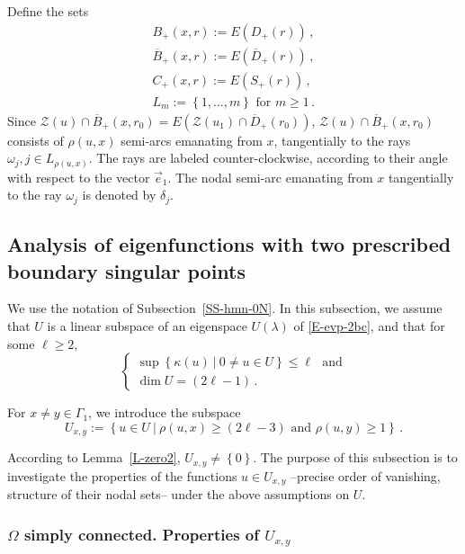 \documentclass[12pt,a4paper]{amsart}
\theoremstyle{plain} %
\theoremstyle{definition}
\numberwithin{equation}{section}
\numberwithin{figure}{section}
\numberwithin{table}{section}
\newcommand{\cZ}{\mathcal{Z}}
\newcommand{\wb}[1]{\overline{#1}}
\newcommand{\set}[1]{\left\lbrace #1 \right\rbrace}
\begin{document}
{Define the sets
%
\begin{equation}\label{E-hmn-21b6}
\begin{array}{l}
B_{+}(x,r) := E(D_{+}(r))\,,\\[5pt]
\wb{B}_{+}(x,r) := E(\wb{D}_{+}(r))\,,\\[5pt]
C_{+}(x,r) := E(S_{+}(r))\,,\\[5pt]
L_m := \set{1, \ldots, m} \text{~for~} m \ge 1\,.
\end{array}
\end{equation}
%
Since $\cZ(u) \cap \wb{B}_{+}(x,r_0) = E\left( \cZ(u_1) \cap
\wb{D}_{+}(r_0)\right)$, $\cZ(u) \cap \wb{B}_{+}(x,r_0)$ consists of $\rho(u,x)$ semi-arcs emanating from $x$, tangentially to the rays $\omega_j, j \in L_{\rho(u,x)}$. The rays are labeled  counter-clockwise, according to their angle with respect to the vector $\vec{e}_1$. The nodal semi-arc emanating from $x$ tangentially to the ray $\omega_j$ is denoted by $\delta_j$.\smallskip


\subsection{Analysis of eigenfunctions with two prescribed  boundary singular points}\label{SS-hmn-21}

We use the notation of Subsection~\ref{SS-hmn-0N}.  In this subsection, we assume that $U$ is a linear subspace of an eigenspace $U(\lambda)$ of \eqref{E-evp-2bc}, and that for some $\ell \ge 2$,
%
\begin{equation*}
\left\{
\begin{array}{l}
\sup\set{\kappa(u) ~|~ 0 \neq u \in U} \le \ell \text{~~and}\\[5pt]
\dim U = (2\ell - 1)\,.
\end{array}%
\right.
\end{equation*}

For $x \neq y \in \Gamma_1$, we introduce the subspace
%
\begin{equation*}%
U_{x,y} := \set{u \in U ~|~ \rho(u,x) \ge (2\ell-3) \text{~and~} \rho(u,y) \ge 1}\,.
\end{equation*}

According to Lemma~\ref{L-zero2},  $U_{x,y} \neq \set{0}$. The purpose of this subsection is to investigate the properties of the functions $u \in U_{x,y}$ --precise order of vanishing, structure of their nodal sets-- under the above assumptions on $U$.

\subsubsection{ $\Omega$ simply connected. Properties of $U_{x,y}$}\label{SSS-hmn-21a}

}
\end{document}
